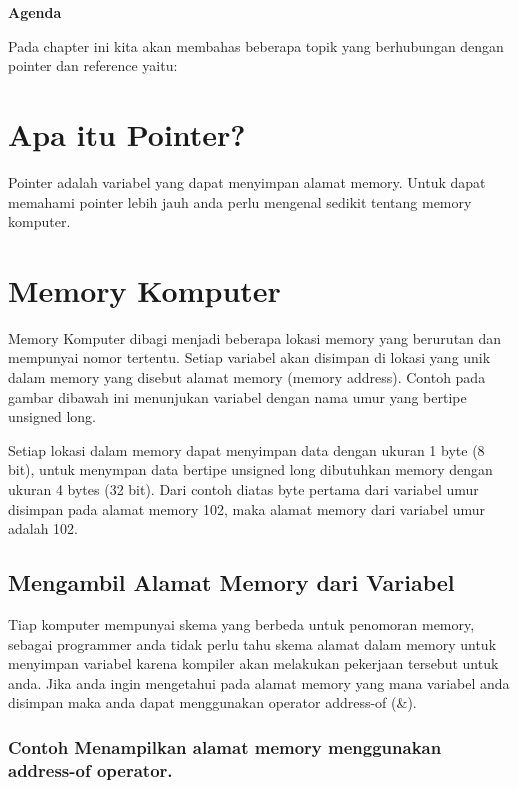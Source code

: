 \textbf{Agenda}

Pada chapter ini kita akan membahas beberapa topik yang berhubungan
dengan pointer dan reference yaitu:

\minitoc

\section{Apa itu Pointer?}\label{apa-itu-pointer}

Pointer adalah variabel yang dapat menyimpan alamat memory. Untuk dapat
memahami pointer lebih jauh anda perlu mengenal sedikit tentang memory
komputer.

\section{Memory Komputer}\label{memory-komputer}

Memory Komputer dibagi menjadi beberapa lokasi memory yang berurutan dan
mempunyai nomor tertentu. Setiap variabel akan disimpan di lokasi yang
unik dalam memory yang disebut alamat memory (memory address). Contoh
pada gambar dibawah ini menunjukan variabel dengan nama umur yang
bertipe unsigned long.

Setiap lokasi dalam memory dapat menyimpan data dengan ukuran 1 byte (8
bit), untuk menympan data bertipe unsigned long dibutuhkan memory dengan
ukuran 4 bytes (32 bit). Dari contoh diatas byte pertama dari variabel
umur disimpan pada alamat memory 102, maka alamat memory dari variabel
umur adalah 102.

\subsection{Mengambil Alamat Memory dari Variabel}\label{mengambil-alamat-memory-dari-variabel}

Tiap komputer mempunyai skema yang berbeda untuk penomoran memory,
sebagai programmer anda tidak perlu tahu skema alamat dalam memory untuk
menyimpan variabel karena kompiler akan melakukan pekerjaan tersebut
untuk anda. Jika anda ingin mengetahui pada alamat memory yang mana
variabel anda disimpan maka anda dapat menggunakan operator address-of
(\&).

\subsubsection*{Contoh  Menampilkan alamat memory menggunakan address-of operator.}

